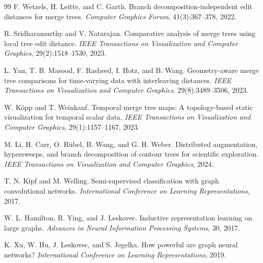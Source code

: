 \documentclass[twocolumn, a4paper, 10pt]{article}
\begin{document}
\begin{thebibliography}{99}
F. Wetzels, H. Leitte, and C. Garth.
Branch decomposition-independent edit distances for merge trees.
\textit{Computer Graphics Forum}, 41(3):367--378, 2022.

R. Sridharamurthy and V. Natarajan.
Comparative analysis of merge trees using local tree edit distance.
\textit{IEEE Transactions on Visualization and Computer Graphics}, 29(2):1518--1530, 2023.

L. Yan, T. B. Masood, F. Rasheed, I. Hotz, and B. Wang.
Geometry-aware merge tree comparisons for time-varying data with interleaving distances.
\textit{IEEE Transactions on Visualization and Computer Graphics}, 29(8):3489--3506, 2023.

W. K\"opp and T. Weinkauf.
Temporal merge tree maps: A topology-based static visualization for temporal scalar data.
\textit{IEEE Transactions on Visualization and Computer Graphics}, 29(1):1157--1167, 2023.

M. Li, H. Carr, O. R\"ubel, B. Wang, and G. H. Weber.
Distributed augmentation, hypersweeps, and branch decomposition of contour trees for scientific exploration.
\textit{IEEE Transactions on Visualization and Computer Graphics}, 2024.

T. N. Kipf and M. Welling.
Semi-supervised classification with graph convolutional networks.
\textit{International Conference on Learning Representations}, 2017.

W. L. Hamilton, R. Ying, and J. Leskovec.
Inductive representation learning on large graphs.
\textit{Advances in Neural Information Processing Systems}, 30, 2017.

K. Xu, W. Hu, J. Leskovec, and S. Jegelka.
How powerful are graph neural networks?
\textit{International Conference on Learning Representations}, 2019.

\end{thebibliography}
\end{document}
